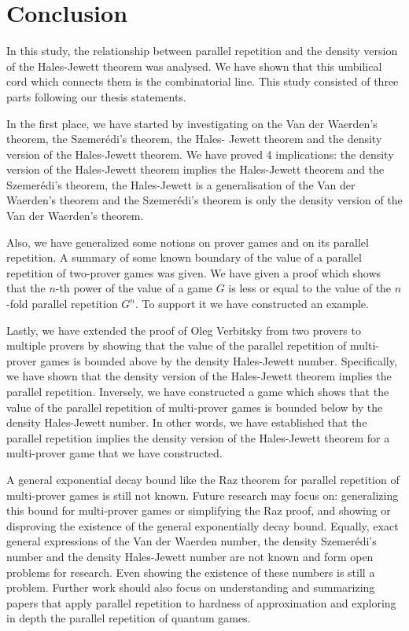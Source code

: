 \chapter{Conclusion}

In this study, the relationship between parallel repetition and the density version of the Hales-Jewett theorem was analysed. We have shown that this umbilical cord which connects them is the combinatorial line. This study consisted of three parts  following our thesis statements. 

In the first place, we have started by investigating on the Van der Waerden's theorem,  the Szemerédi's theorem, the Hales-  Jewett theorem and the density version of the Hales-Jewett theorem. We have proved 4 implications: the density version of the Hales-Jewett theorem implies the Hales-Jewett theorem and the Szemerédi's theorem, the Hales-Jewett is a generalisation of the Van der Waerden's theorem and the Szemerédi's theorem is only the density version of the Van der Waerden's theorem.

Also, we have generalized some notions on prover games and on its parallel repetition. A summary of some known boundary of the value of a parallel repetition of two-prover games was given. We have given a proof which shows that the $n$-th power of the value of a game $G$  is less or equal to the value of the $n$-fold parallel repetition $G^n.$ To support it we have constructed  an example.

Lastly, we have extended the proof of Oleg Verbitsky from two provers to multiple provers by showing that the value of the parallel repetition of multi-prover games is bounded above by the density Hales-Jewett number. Specifically, we have shown that the density version of the Hales-Jewett theorem implies the parallel repetition. Inversely, we have constructed a game which shows that the value of the parallel repetition of multi-prover games is bounded below by the density Hales-Jewett number. In other words, we have established that the parallel repetition implies the density version of the Hales-Jewett theorem for a multi-prover game that we have constructed.

A general exponential decay bound like the Raz theorem for parallel repetition of  multi-prover games is still not known. Future research may focus on: generalizing this bound for multi-prover games or simplifying the Raz proof, and showing or disproving the existence of the general exponentially decay bound. Equally,  exact general expressions of the Van der Waerden number, the density Szemerédi's number and the density Hales-Jewett number are not known and form open problems for research. Even showing the existence of these numbers is still a problem. Further work should also focus on understanding and summarizing papers that apply parallel repetition to hardness of approximation and exploring in depth the parallel repetition of quantum games.